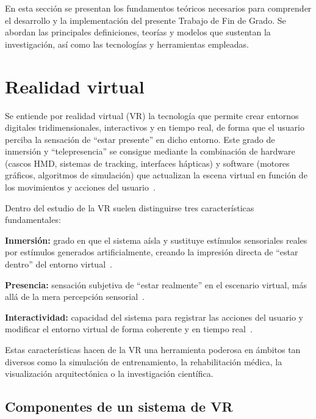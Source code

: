 En esta sección se presentan los fundamentos teóricos necesarios para comprender el desarrollo y la implementación del presente Trabajo de Fin de Grado. Se abordan las principales definiciones, teorías y modelos que sustentan la investigación, así como las tecnologías y herramientas empleadas. 
\section{Realidad virtual}
Se entiende por realidad virtual (VR) la tecnología que permite crear entornos digitales tridimensionales, interactivos y en tiempo real, de forma que el usuario perciba la sensación de “estar presente” en dicho entorno. Este grado de inmersión y “telepresencia” se consigue mediante la combinación de hardware (cascos HMD, sistemas de tracking, interfaces hápticas) y software (motores gráficos, algoritmos de simulación) que actualizan la escena virtual en función de los movimientos y acciones del usuario~\cite{steuer92,sherman2002}.

Dentro del estudio de la VR suelen distinguirse tres características fundamentales:

\textbf{Inmersión:} grado en que el sistema aísla y sustituye estímulos sensoriales reales por estímulos generados artificialmente, creando la impresión directa de “estar dentro” del entorno virtual~\cite{milgram94}.

\textbf{Presencia:} sensación subjetiva de “estar realmente” en el escenario virtual, más allá de la mera percepción sensorial~\cite{sherman2002,slater94}.

\textbf{Interactividad:} capacidad del sistema para registrar las acciones del usuario y modificar el entorno virtual de forma coherente y en tiempo real~\cite{steuer92,milgram94}.

Estas características hacen de la VR una herramienta poderosa en ámbitos tan diversos como la simulación de entrenamiento, la rehabilitación médica, la visualización arquitectónica o la investigación científica.

\subsection{Componentes de un sistema de VR}

